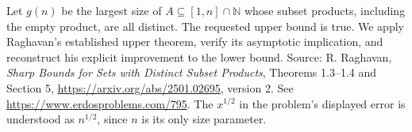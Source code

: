 Let \(g(n)\) be the largest size of \(A\subseteq[1,n]\cap\mathbb N\)
whose subset products, including the empty product, are all distinct.
The requested upper bound is true. We apply Raghavan's
established upper theorem, verify its asymptotic implication,
and reconstruct his explicit improvement to the lower bound.
Source: R. Raghavan, \emph{Sharp Bounds for Sets with Distinct
Subset Products}, Theorems 1.3--1.4 and Section 5,
\url{https://arxiv.org/abs/2501.02695}, version 2.
See \url{https://www.erdosproblems.com/795}.
The \(x^{1/2}\) in the problem's displayed error is understood
as \(n^{1/2}\), since \(n\) is its only size parameter.
